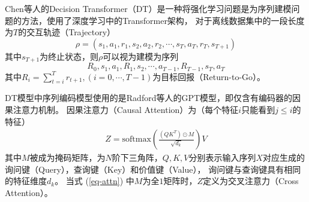 \documentclass[openany,twoside,nofonts,AutoFakeBold,UTF8]{ctexbook}
\begin{document}
Chen等人\cite{DT}的Decision Transformer（DT）是一种将强化学习问题是为序列建模问题的方法，使用了深度学习中的Transformer架构，
对于离线数据集中的一段长度为$T$的交互轨迹（Trajectory）
\begin{equation}
  \rho = (s_1,a_1,r_1,s_2,a_2,r_2,\cdots,s_T,a_T,r_T,s_{T+1})
\end{equation}
其中$s_{T+1}$为终止状态，则$\rho$可以视为建模为序列
\begin{equation}\label{eq-sequence}
  R_0,s_1,a_1,R_1,s_2,\cdots,a_{T-1},R_{T-1},s_{T},a_{T}
\end{equation}
其中$R_i=\sum_{t=i}^Tr_{t+1}, (i=0,\cdots,T-1)$为目标回报（Return-to-Go）。

DT模型中序列编码模型使用的是Radford等人\cite{GPT}的GPT模型，即仅含有编码器的因果注意力机制。
因果注意力（Causal Attention）为（每个特征$i$只能看到$j\leqslant i$的特征）
\begin{equation}\label{eq-attn}
\begin{aligned}
  Z = \text{softmax}\left(\frac{\left(QK^T\right)\odot M}{\sqrt{d_k}}\right)V
\end{aligned}
\end{equation}
其中$M$被成为掩码矩阵，为$N$阶下三角阵，$Q,K,V$分别表示输入序列$X$对应生成的询问键（Query），查询键（Key）和价值键（Value），
询问键与查询键具有相同的特征维度$d_k$。
当式 (\ref{eq-attn}) 中$M$为全$1$矩阵时，$Z$定义为交叉注意力（Cross Attention）。
\end{document}
